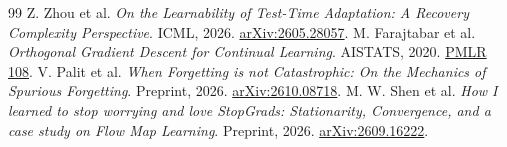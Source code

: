 \documentclass[11pt,a4paper]{article}
\begin{document}
\begin{thebibliography}{99}
 Z. Zhou et al. \emph{On the Learnability of Test-Time
Adaptation: A Recovery Complexity Perspective}. ICML, 2026.
\href{https://arxiv.org/abs/2605.28057}{arXiv:2605.28057}.
 M. Farajtabar et al. \emph{Orthogonal Gradient Descent for
Continual Learning}. AISTATS, 2020.
\href{https://proceedings.mlr.press/v108/farajtabar20a.html}{PMLR 108}.
 V. Palit et al. \emph{When Forgetting is not Catastrophic:
On the Mechanics of Spurious Forgetting}. Preprint, 2026.
\href{https://arxiv.org/abs/2610.08718}{arXiv:2610.08718}.
 M. W. Shen et al. \emph{How I learned to stop worrying
and love StopGrads: Stationarity, Convergence, and a case study on Flow Map
Learning}. Preprint, 2026.
\href{https://arxiv.org/abs/2609.16222}{arXiv:2609.16222}.
\end{thebibliography}
\end{document}
